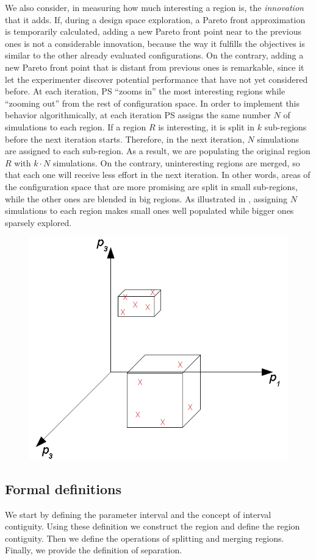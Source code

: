 We also consider, in measuring how much interesting a region is, the
\emph{innovation} that it adds. If, during a design space exploration,
a Pareto front approximation is temporarily calculated, adding a new Pareto front
point near to the previous ones is not a considerable innovation,
because the way it fulfills the objectives is similar to the other
already evaluated configurations. On the contrary, adding a new Pareto
front point that is distant from previous ones is remarkable,
since it let the experimenter discover potential performance that have not yet considered before.
At each iteration, PS ``zooms in'' the most interesting regions while ``zooming out'' from the rest of configuration space. In order to implement this behavior algorithmically, at each iteration PS assigns the same number $N$ of simulations to each region. If a region $R$ is interesting, it is split in $k$ sub-regions before the next iteration starts. Therefore, in the next iteration, $N$ simulations are assigned to each sub-region. As a result, we are populating the original region $R$ with $k\cdot N$ simulations. On the contrary, uninteresting regions are merged, so that each one will receive less effort in the next iteration. In other words, areas of the configuration space that are more promising are split in small sub-regions, while the other ones are blended in big regions. As illustrated in , assigning $N$ simulations to each region makes small ones well populated while bigger ones sparsely explored.


	\begin{figure}[t]
	\center
	\includegraphics[width=0.5\columnwidth]{img/small_and_big}
	\end{figure}


\subsection{Formal definitions}
We start by defining the parameter interval and the concept of interval contiguity. Using these definition we construct the region and define the region contiguity. Then we define the operations of splitting and merging regions. Finally, we provide the definition of separation.

